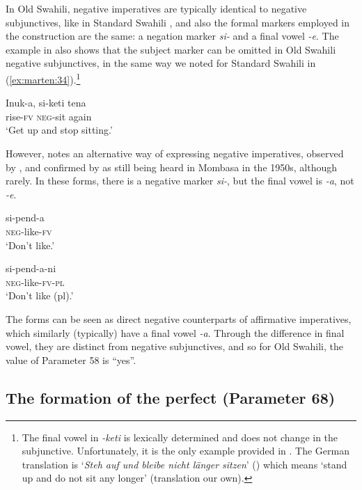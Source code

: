 \documentclass[output=paper]{langscibook}
\begin{document}
  In Old Swahili, negative imperatives are typically identical to negative subjunctives, like in Standard Swahili \citep[249]{Miehe1979}, and also the formal markers employed in the construction are the same: a negation marker \textit{{}si-} and a final vowel \textit{{}-e}. The example in  also shows that the subject marker can be omitted in Old Swahili negative subjunctives, in the same way we noted for Standard Swahili in (\ref{ex:marten:34}).\footnote{The final vowel in \textit{{}-keti} is lexically determined and does not change in the subjunctive. Unfortunately, it is the only example provided in \citet{Miehe1979}. The German translation is ‘\textit{Steh auf und bleibe nicht länger sitzen}’ (\citeyear[249]{Miehe1979}) which means ‘stand up and do not sit any longer’ (translation our own).} 

\ea\label{ex:marten:34}\gll Inuk-a,   si-keti   tena\\
rise-\textsc{fv}   \textsc{neg}{}-sit   again\\
\glt ‘Get up and stop sitting.’ \citep[249]{Miehe1979}
\z

However, \citet[251]{Miehe1979} notes an alternative way of expressing negative imperatives, observed by \citet[56]{Krapf1850}, and confirmed by \citet{Whiteley1955} as still being heard in Mombasa in the 1950s, although rarely. In these forms, there is a negative marker \textit{{}si-}, but the final vowel is \textit{{}-a}, not \textit{{}-e}. 

\ea\label{ex:marten:35}
    \ea\label{ex:marten:35a} \gll  si-pend-a\\
    \textsc{neg}{}-like-\textsc{fv}\\
    \glt ‘Don’t like.’ \citep[251]{Miehe1979}

    \ex\label{ex:marten:35b} \gll  si-pend-a-ni\\
    \textsc{neg}{}-like-\textsc{fv-pl}\\
    \glt ‘Don’t like (pl).’ \citep[251]{Miehe1979}
    \z
\z

The forms can be seen as direct negative counterparts of affirmative imperatives, which similarly (typically) have a final vowel \textit{{}-a}. Through the difference in final vowel, they are distinct from negative subjunctives, and so for Old Swahili, the value of Parameter 58 is ``yes''.

\subsection{The formation of the perfect (Parameter 68)}\label{sec:marten:3.6}
\end{document}
